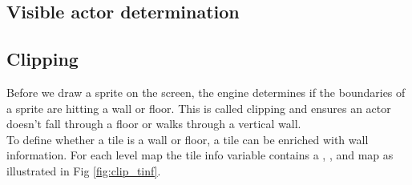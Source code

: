 \documentclass[book.tex]{subfiles}
\begin{document}
\subsection{Visible actor determination}


\subsection{Clipping}
Before we draw a sprite on the screen, the engine determines if the boundaries of a sprite are hitting a wall or floor. This is called clipping and ensures an actor doesn't fall through a floor or walks through a vertical wall.\\
To define whether a tile is a wall or floor, a tile can be enriched with wall information. For each level map the tile info variable  contains a , ,  and  map as illustrated in Fig \ref{fig:clip_tinf}.
\end{document}
